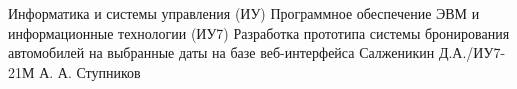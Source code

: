 \makecourseworktitle
{Информатика и системы управления (ИУ)}
{Программное обеспечение ЭВМ и информационные технологии (ИУ7)}
{Разработка прототипа системы бронирования автомобилей на выбранные даты на базе веб-интерфейса}
{Салженикин Д.А./ИУ7-21М}
{А. А. Ступников}
{~}
